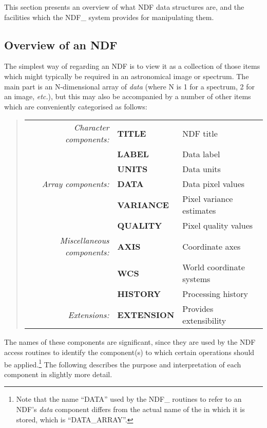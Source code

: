 \documentclass[twoside,11pt,nolof]{starlink}
\providecommand{\st}[1]{{\emph{#1}}}
\begin{document}
This section presents an overview of what NDF data structures are, and the
facilities which the NDF\_ system provides for manipulating them.

\subsection{\label{ss:componentnames}Overview of an NDF}

The simplest way of regarding an NDF is to view it as a collection of those
items which might typically be required in an astronomical image or
spectrum.
The main part is an N-dimensional array of \st{data\/} (where N is 1 for a
spectrum, 2 for an image, \st{etc.}), but this may also be accompanied by a
number of other items which are conveniently categorised as follows:

\small
\begin{quote}
\begin{center}
\begin{tabular}{rl@{ --- }l}
    \st{Character components:} & \textbf{TITLE} & NDF title\\
                                & \textbf{LABEL} & Data label\\
                                & \textbf{UNITS} & Data units\\[1ex]
        \st{Array components:} & \textbf{DATA}  & Data pixel values\\
                                & \textbf{VARIANCE} & Pixel variance estimates\\
                                & \textbf{QUALITY} & Pixel quality values\\[1ex]
\st{Miscellaneous components:} & \textbf{AXIS} & Coordinate axes\\
                                & \textbf{WCS} & World coordinate systems\\
                                & \textbf{HISTORY} & Processing history\\[1ex]
              \st{Extensions:} & \textbf{EXTENSION} & Provides extensibility
\end{tabular}
\end{center}
\end{quote}
\normalsize

The names of these components are significant, since they are used by the
NDF access routines to identify the component(s) to which certain operations
should be applied.\footnote{Note that the name ``DATA'' used by the
NDF\_ routines to refer to an NDF's \st{data\/} component differs
from the actual name of the  in
which it is stored, which is ``DATA\_ARRAY''.}
The following describes the purpose and interpretation of each component in
slightly more detail.
\end{document}
